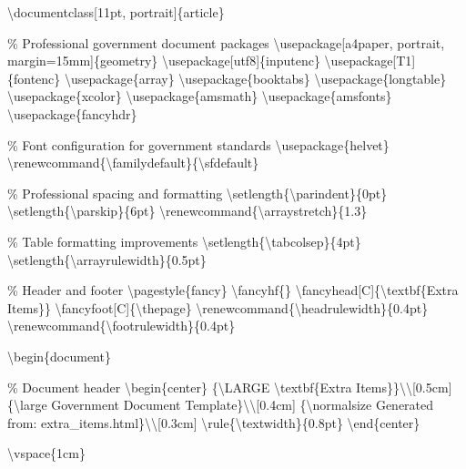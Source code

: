 \textbackslash{}documentclass[11pt, portrait]\{article\}

\% Professional government document packages
\textbackslash{}usepackage[a4paper, portrait, margin=15mm]\{geometry\}
\textbackslash{}usepackage[utf8]\{inputenc\}
\textbackslash{}usepackage[T1]\{fontenc\}
\textbackslash{}usepackage\{array\}
\textbackslash{}usepackage\{booktabs\}
\textbackslash{}usepackage\{longtable\}
\textbackslash{}usepackage\{xcolor\}
\textbackslash{}usepackage\{amsmath\}
\textbackslash{}usepackage\{amsfonts\}
\textbackslash{}usepackage\{fancyhdr\}

\% Font configuration for government standards
\textbackslash{}usepackage\{helvet\}
\textbackslash{}renewcommand\{\textbackslash{}familydefault\}\{\textbackslash{}sfdefault\}

\% Professional spacing and formatting
\textbackslash{}setlength\{\textbackslash{}parindent\}\{0pt\}
\textbackslash{}setlength\{\textbackslash{}parskip\}\{6pt\}
\textbackslash{}renewcommand\{\textbackslash{}arraystretch\}\{1.3\}

\% Table formatting improvements
\textbackslash{}setlength\{\textbackslash{}tabcolsep\}\{4pt\}
\textbackslash{}setlength\{\textbackslash{}arrayrulewidth\}\{0.5pt\}

\% Header and footer
\textbackslash{}pagestyle\{fancy\}
\textbackslash{}fancyhf\{\}
\textbackslash{}fancyhead[C]\{\textbackslash{}textbf\{Extra Items\}\}
\textbackslash{}fancyfoot[C]\{\textbackslash{}thepage\}
\textbackslash{}renewcommand\{\textbackslash{}headrulewidth\}\{0.4pt\}
\textbackslash{}renewcommand\{\textbackslash{}footrulewidth\}\{0.4pt\}

\textbackslash{}begin\{document\}

\% Document header
\textbackslash{}begin\{center\}
\{\textbackslash{}LARGE \textbackslash{}textbf\{Extra Items\}\}\textbackslash{}\textbackslash{}[0.5cm]
\{\textbackslash{}large Government Document Template\}\textbackslash{}\textbackslash{}[0.4cm]
\{\textbackslash{}normalsize Generated from: extra\_items.html\}\textbackslash{}\textbackslash{}[0.3cm]
\textbackslash{}rule\{\textbackslash{}textwidth\}\{0.8pt\}
\textbackslash{}end\{center\}

\textbackslash{}vspace\{1cm\}

